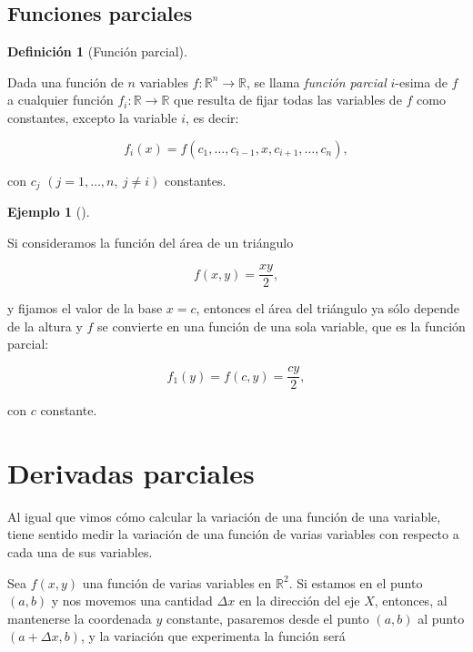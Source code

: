 \documentclass[
  a4paper,
]{scrreport}
\theoremstyle{definition}
\newtheorem{definition}{Definición}[chapter]
\theoremstyle{plain}
\theoremstyle{plain}
\theoremstyle{definition}
\theoremstyle{definition}
\newtheorem{example}{Ejemplo}[chapter]
\theoremstyle{plain}
\theoremstyle{remark}
\begin{document}
\hypertarget{funciones-parciales}{%
\subsection{Funciones parciales}\label{funciones-parciales}}

\begin{definition}[Función
parcial]\protect\hypertarget{def-funcion-parcial}{}\label{def-funcion-parcial}

Dada una función de \(n\) variables
\(f:\mathbb{R}^n\rightarrow \mathbb{R}\), se llama \emph{función
parcial} \(i\)-esima de \(f\) a cualquier función
\(f_i:\mathbb{R}\rightarrow \mathbb{R}\) que resulta de fijar todas las
variables de \(f\) como constantes, excepto la variable \(i\), es decir:

\[f_i(x)=f(c_1,\ldots,c_{i-1},x,c_{i+1},\ldots,c_{n}),\]

con \(c_j\) \((j=1,\ldots, n,\ j\neq i)\) constantes.

\end{definition}

\begin{example}[]\protect\hypertarget{exm-funcion-parcial}{}\label{exm-funcion-parcial}

Si consideramos la función del área de un triángulo

\[f(x,y)=\frac{xy}{2},\]

y fijamos el valor de la base \(x=c\), entonces el área del triángulo ya
sólo depende de la altura y \(f\) se convierte en una función de una
sola variable, que es la función parcial:

\[
f_1(y)=f(c,y)=\frac{cy}{2},
\]

con \(c\) constante.

\end{example}

\hypertarget{derivadas-parciales}{%
\section{Derivadas parciales}\label{derivadas-parciales}}

Al igual que vimos cómo calcular la variación de una función de una
variable, tiene sentido medir la variación de una función de varias
variables con respecto a cada una de sus variables.

Sea \(f(x,y)\) una función de varias variables en \(\mathbb{R}^2\). Si
estamos en el punto \((a,b)\) y nos movemos una cantidad \(\Delta x\) en
la dirección del eje \(X\), entonces, al mantenerse la coordenada \(y\)
constante, pasaremos desde el punto \((a,b)\) al punto
\((a+\Delta x,b)\), y la variación que experimenta la función será
\end{document}
